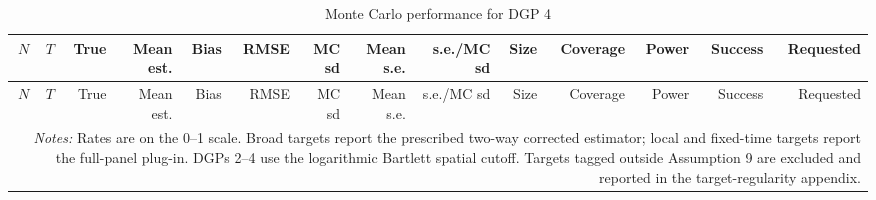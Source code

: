 \begingroup
\small
\begin{longtable}{rrrrrrrrrrrrrr}
\caption{Monte Carlo performance for DGP 4}\label{tab:mc-dgp4}\\
\toprule
$N$ & $T$ & True & Mean est. & Bias & RMSE & MC sd & Mean s.e. & s.e./MC sd & Size & Coverage & Power & Success & Requested \\
\midrule
\endfirsthead
\toprule
$N$ & $T$ & True & Mean est. & Bias & RMSE & MC sd & Mean s.e. & s.e./MC sd & Size & Coverage & Power & Success & Requested \\
\midrule
\endhead
\bottomrule
\multicolumn{14}{p{0.96\linewidth}}{\footnotesize \textit{Notes:} Rates are on the 0--1 scale. Broad targets report the prescribed two-way corrected estimator; local and fixed-time targets report the full-panel plug-in. DGPs 2--4 use the logarithmic Bartlett spatial cutoff. Targets tagged outside Assumption 9 are excluded and reported in the target-regularity appendix.} \\
\end{longtable}
\endgroup
